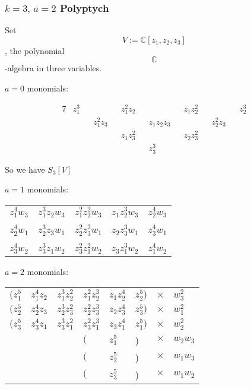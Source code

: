 \documentclass{article}
\newcommand{\CC}{\mathbb{C}}
\begin{document}
	\subsubsection{$k = 3,\, a = 2$ Polyptych}
	
	Set $$ V := \CC[z_{1}, z_{2}, z_{3}] $$, the polynomial $$ \CC $$-algebra in three variables.
	
	$a = 0$ monomials:
	
	\begin{alignat*}{7}
		& z_{1}^{3} && && z_{1}^{2}z_{2} && && z_{1}z_{2}^{2} && && z_{2}^{3} \\
		& && z_{1}^{2}z_{3} && && z_{1}z_{2}z_{3} && && z_{2}^{2}z_{3} && \\
		& && && z_{1}z_{3}^{2} && && z_{2}z_{3}^{2} && &&  \\
		& && && && z_{3}^{3} && && &&
	\end{alignat*}
	
	
	So we have $S_{3}[V]$
	
	$a = 1$ monomials:
	
	\begin{table}[]
		\begin{tabular}{lllll}
			$z_{1}^{4} w_{3}$ & $z_{1}^{3} z_{2} w_{3}$ & $z_{1}^{2} z_{2}^{2} w_{3}$ & $z_{1} z_{2}^{3} w_{3}$ & $z_{2}^{4}w_{3}$ \\
			&                       &                           &                       &                  \\
			$z_{2}^{4} w_{1}$ & $z_{2}^{3} z_{3} w_{1}$ & $z_{2}^{2} z_{3}^{2} w_{1}$ & $z_{2} z_{3}^{3} w_{1}$ & $z_{3}^{4}w_{1}$ \\
			&                       &                           &                       &                  \\
			$z_{3}^{4} w_{2}$ & $z_{3}^{3} z_{1} w_{2}$ & $z_{3}^{2} z_{1}^{2} w_{2}$ & $z_{3} z_{1}^{3} w_{2}$ & $z_{1}^{4}w_{2}$            
		\end{tabular}
	\end{table}


	$a = 2$ monomials:
	
	\begin{table}[]
		\begin{tabular}{lllllll}
			$\bigg(z_{1}^{5}$ & $z_{1}^{4}z_{2}$ & $z_{1}^{3}z_{2}^{2}$ & $z_{1}^{2}z_{2}^{3}$ & $z_{1}z_{2}^{4}$ & $z_{2}^{5} \bigg)$ & $\times \quad w_{3}^{2}$ \\
			$\bigg(z_{2}^{5}$ & $z_{2}^{4}z_{3}$ & $z_{2}^{3}z_{3}^{2}$ & $z_{2}^{2}z_{3}^{3}$ & $z_{2}z_{3}^{4}$ & $z_{3}^{5} \bigg)$ & $\times \quad w_{1}^{2}$ \\
			$\bigg(z_{3}^{5}$ & $z_{3}^{4}z_{1}$ & $z_{3}^{3}z_{1}^{2}$ & $z_{3}^{2}z_{1}^{3}$ & $z_{3}z_{1}^{4}$ & $z_{1}^{5} \bigg)$ & $\times \quad w_{2}^{2}$ \\
			& & & $\big($ & $z_{1}^{5}$ & \big)& $\times \quad w_{2}w_{3}$ \\
			& & & $\big($ & $z_{2}^{5}$ & \big)& $\times \quad w_{1}w_{3}$ \\
			& & & $\big($ & $z_{3}^{5}$ & \big)& $\times \quad w_{1}w_{2}$ \\              
		\end{tabular}
	\end{table}
\end{document}
